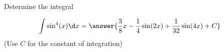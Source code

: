 \documentclass{ximera}
\author{Jason Miller}
\begin{document}
\begin{exercise}
Determine the integral

\[
\int \sin^{4}(x) \d x= \answer{     \frac{3}{8}x-\frac{1}{4} \sin(2x) + \frac{1}{32} \sin(4x) +C} 
\]
(Use $C$ for the constant of integration)

\end{exercise}
\end{document}
